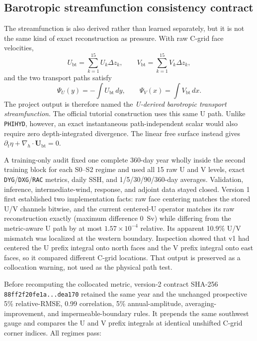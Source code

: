\documentclass[11pt]{article}
\begin{document}
\subsection{Barotropic streamfunction consistency contract}

The streamfunction is also derived rather than learned separately, but it is not the
same kind of exact reconstruction as pressure.  With raw C-grid face velocities,
\[
U_{\mathrm{bt}}=\sum_{k=1}^{15}U_k\Delta z_k,\qquad
V_{\mathrm{bt}}=\sum_{k=1}^{15}V_k\Delta z_k,
\]
and the two transport paths satisfy
\[
\Psi_U(y)=-\int U_{\mathrm{bt}}\,dy,\qquad
\Psi_V(x)= \int V_{\mathrm{bt}}\,dx.
\]
The project output is therefore named the \emph{U-derived barotropic transport
streamfunction}.  The official tutorial construction uses this same U path.  Unlike
\texttt{PHIHYD}, however, an exact instantaneous path-independent scalar would also
require zero depth-integrated divergence.  The linear free surface instead gives
\(\partial_t\eta+\nabla_h\cdot\mathbf U_{\mathrm{bt}}=0\).

A training-only audit fixed one complete 360-day year wholly inside the second
training block for each S0--S2 regime and used all 15 raw U and V levels, exact
\texttt{DYG}/\texttt{DXG}/\texttt{RAC} metrics, daily SSH, and
1/5/30/90/360-day averages.  Validation, inference, intermediate-wind, response, and
adjoint data stayed closed.  Version 1 first established two implementation facts:
raw face centering matches the stored U/V channels bitwise, and the current centered-U
operator matches its raw reconstruction exactly (maximum difference \(0\)~Sv) while
differing from the metric-aware U path by at most \(1.57\times10^{-4}\) relative.
Its apparent 10.9\% U/V mismatch was localized at the western boundary.  Inspection
showed that v1 had centered the U prefix integral onto north faces and the V prefix
integral onto east faces, so it compared different C-grid locations.  That output is
preserved as a collocation warning, not used as the physical path test.

Before recomputing the collocated metric, version-2 contract SHA-256
\texttt{88ff2f20fe1a...dea170} retained the same year and the unchanged prospective
5\% relative-RMSE, 0.99 correlation, 5\% annual-amplitude, averaging-improvement, and
impermeable-boundary rules.  It prepends the same southwest gauge and compares the U
and V prefix integrals at identical unshifted C-grid corner indices.  All regimes pass:
\end{document}
